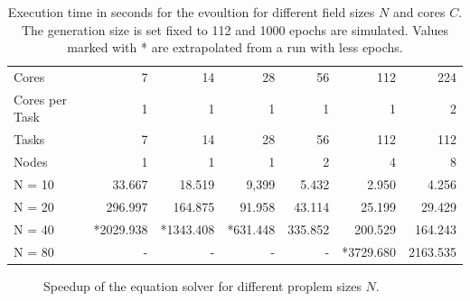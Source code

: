 \documentclass[12pt]{article}
\begin{document}
\begin{table}[p]
    \centering
    \begin{tabular}{lrrrrrr}
        \toprule
        Cores & 7 & 14 & 28 & 56 & 112 & 224 \\
        Cores per Task & 1 & 1 & 1 & 1 & 1 & 2 \\
        Tasks & 7 & 14 & 28 & 56 & 112 & 112 \\
        Nodes & 1 & 1 & 1 & 2 & 4 & 8 \\
        \midrule
        N = 10 & 33.667     & 18.519 & 9,399 & 5.432 & 2.950 & 4.256 \\
        N = 20 & 296.997    & 164.875 & 91.958 & 43.114 & 25.199 & 29.429 \\
        N = 40 & *2029.938 & *1343.408 & *631.448 & 335.852 & 200.529 & 164.243 \\
        N = 80 & - & - & - & - & *3729.680 & 2163.535 \\
        \bottomrule
    \end{tabular}
    \caption{Execution time in seconds for the evoultion for different field sizes $N$ and cores $C$. The generation size is set fixed to 112 and 1000 epochs are simulated. Values marked with * are extrapolated from a run with less epochs.}
    \label{tab:SpeedupEvolution}
\end{table}

\begin{figure}[p]
    \centering
    
    \caption{Speedup of the equation solver for different proplem sizes $N$.}
    \label{fig:SpeedupEvolution}
\end{figure}


\clearpage
\end{document}
